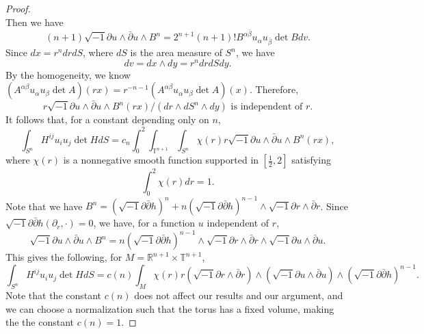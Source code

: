 \documentclass[reqno]{amsart}
\theoremstyle{remark}
\def\p{\partial}
\def\R{\mathbb{R}}
\theoremstyle{plain}
\newcommand{\ddc}{\sqrt{-1}\partial\bar\partial}
\begin{document}
\begin{proof}
\[\]
Then we have 
\[(n+1)\sqrt{-1}\partial u\wedge\bar{\partial}u\wedge B^n=2^{n+1}(n+1)!B^{\alpha\bar{\beta}}u_\alpha u_{\bar{\beta}}\det B dv.\]
Since $dx=r^{n}drdS$, where $dS$ is the area measure of $S^n$, we have  \[dv=dx\wedge dy=r^{n}drdSdy.\] 
By the homogeneity, we know $(A^{\alpha\beta}u_\alpha u_\beta\det A)(rx)=r^{-n-1}(A^{\alpha\beta}u_\alpha u_\beta\det A)(x).$ Therefore, \[
r\sqrt{-1}\partial u\wedge\bar{\partial}u\wedge B^n(rx)/(dr\wedge dS^n\wedge dy) \text{ is independent of }r.
\]
It follows that, for a constant depending only on $n$, 
\[
\int_{S^n}H^{ij}u_iu_j\det HdS=c_n\int_0^2\int_{\mathbb{T}^{n+1}}\int_{S^n}\chi(r)r\sqrt{-1}\partial u\wedge\bar{\partial} u\wedge B^n(rx),
\] where $\chi(r)$ is a nonnegative smooth function supported in $[\frac{1}{2},2]$ satisfying  \[\int_0^2\chi(r)dr=1.\]
Note that we  have $B^n=(\ddc h)^n+n(\ddc h)^{n-1}\wedge\sqrt{-1}\partial r\wedge\bar{\partial}r$. Since $\sqrt{-1}\partial \bar\partial h(\p_r, \cdot)=0$, we have, for a function $u$ independent of $r$, 
\[
\sqrt{-1}\partial u\wedge\bar{\partial} u\wedge B^n=n(\ddc h)^{n-1}\wedge\sqrt{-1}\partial r\wedge\bar{\partial}r\wedge \sqrt{-1}\partial u\wedge \bar\partial u.
\]
This gives the following, for $M=\R^{n+1}\times \mathbb{T}^{n+1}$, 
\begin{equation}\label{identity-001}
    \int_{S^n}H^{ij}u_iu_j\det HdS=c(n)\int_{M} \chi{(r)} r (\sqrt{-1}\partial r\wedge \bar\partial r)\wedge (\sqrt{-1}\partial u\wedge \bar\partial u)\wedge (\sqrt{-1}\partial\bar\partial h)^{n-1}.
\end{equation}
Note that the constant $c(n)$ does not affect our results and our argument, and we can choose a normalization such that the torus has a fixed volume, making the the constant $c(n)=1$. 


\end{proof}
\end{document}
